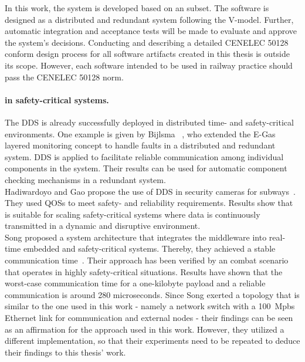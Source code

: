 In this work, the system is developed based on an  subset.
The software is designed as a distributed and redundant system following the V-model.
Further, automatic integration and acceptance tests will be made to evaluate and approve the system's decisions.
Conducting and describing a detailed CENELEC 50128 conform design process for all software artifacts created in this thesis is outside its scope.
However, each software intended to be used in railway practice should pass the CENELEC 50128 norm.

\paragraph{ in safety-critical systems.}
The \gls*{DDS} is already successfully deployed in distributed time- and safety-critical environments.
One example is given by Bijlsma \etal~\cite{DistributedSafety2020}, who extended the E-Gas layered monitoring concept to handle faults in a distributed and redundant system.
\Gls*{DDS} is applied to facilitate reliable communication among individual components in the system.
Their results can be used for automatic component checking mechanisms in a redundant system.
\\

Hadiwardoyo and Gao propose the use of \gls*{DDS} in security cameras for subways~\cite{DDSInSubways}.
They used \glspl*{QOS} to meet safety- and reliability requirements.
Results show that  is suitable for scaling safety-critical systems where data is continuously transmitted in a dynamic and disruptive environment.
\\

Song \etal proposed a system architecture that integrates the  middleware into real-time embedded and safety-critical systems.
Thereby, they achieved a stable communication time~\cite{SongDDSInRealTimeSystems}.
Their approach has been verified by an  combat scenario that operates in highly safety-critical situations.
Results have shown that the worst-case communication time for a one-kilobyte payload and a reliable communication  is around 280 microseconds.
Since Song \etal exerted a topology that is similar to the one used in this work - namely a network switch with a 100~Mpbs Ethernet link for communication and external nodes - their findings can be seen as an affirmation for the approach used in this work.
However, they utilized a different  implementation, so that their experiments need to be repeated to deduce their findings to this thesis' work. 
\\

